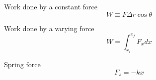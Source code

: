 \documentclass[avery5371]{flashcards}
\begin{document}
\begin{flashcard}[Chapter 7]{Work done by a constant force}
\bigskip
\bigskip
\begin{displaymath}
W \equiv F\Delta r \cos \theta
\end{displaymath}
\end{flashcard}

\begin{flashcard}[Chapter 7]{Work done by a varying force}
\bigskip
\bigskip
\begin{displaymath}
W = \int_{x_{i}}^{x_{f}} F_{x}dx
\end{displaymath}
\end{flashcard}

\begin{flashcard}[Chapter 7]{Spring force}
\bigskip
\bigskip
\begin{displaymath}
F_{s} = -kx
\end{displaymath}
\end{flashcard}
\end{document}
